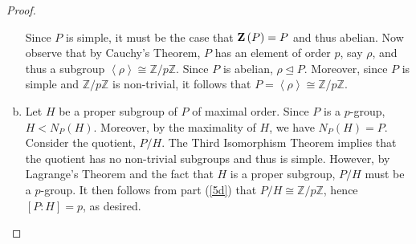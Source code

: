 \documentclass[10pt]{amsart}
\begin{document}
\begin{thm}
\begin{proof}
\begin{enumerate}[(a)]
      Since $P$ is simple, it must be the case that $\mathbf{Z}\left(P\right) = P$ and thus abelian.
      Now observe that by Cauchy's Theorem, $P$ has an element of order $p$, say $\rho$, and thus a subgroup $\left<\rho\right> \cong \mathbb{Z}/p\mathbb{Z}$.
      Since $P$ is abelian, $\rho \unlhd P$.
      Moreover, since $P$ is simple and $\mathbb{Z}/p\mathbb{Z}$ is non-trivial, it follows that  $P = \left<\rho\right> \cong \mathbb{Z}/p\mathbb{Z}$.
    \item\label{5e}
      Let $H$ be a proper subgroup of $P$ of maximal order.
      Since $P$ is a $p$-group, $H < N_P(H)$.
      Moreover, by the maximality of $H$, we have $N_P(H) = P$.
      Consider the quotient, $P/H$.
      The Third Isomorphism Theorem implies that the quotient has no non-trivial subgroups and thus is simple.
      However, by Lagrange's Theorem and the fact that $H$ is a proper subgroup, $P/H$ must be a $p$-group.
      It then follows from part (\ref{5d}) that $P/H \cong \mathbb{Z}/p\mathbb{Z}$, hence $[P:H] = p$, as desired. 
    \end{enumerate}
  \end{proof}
\end{thm}
\end{document}

